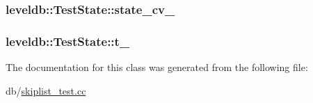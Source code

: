 \subsubsection[{state\+\_\+cv\+\_\+}]{ leveldb\+::\+Test\+State\+::state\+\_\+cv\+\_\+\hspace{0.3cm}{\ttfamily [private]}}\label{classleveldb_1_1_test_state_a57e246c3b9588ae25bc647cf079e2cdd}
\hypertarget{classleveldb_1_1_test_state_a090fd0c59fb141c4843511b4020f05e9}{}
\subsubsection[{t\+\_\+}]{ leveldb\+::\+Test\+State\+::t\+\_\+}\label{classleveldb_1_1_test_state_a090fd0c59fb141c4843511b4020f05e9}


The documentation for this class was generated from the following file\+:\begin{DoxyCompactItemize}
\item 
db/\hyperlink{skiplist__test_8cc}{skiplist\+\_\+test.\+cc}\end{DoxyCompactItemize}
